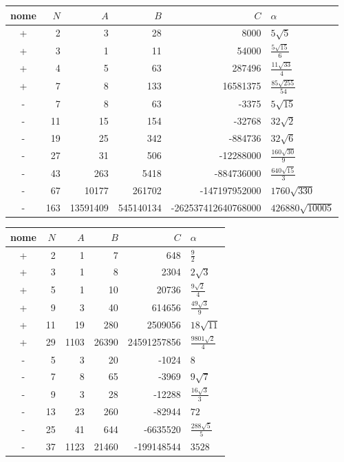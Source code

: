 \begin{identitytable}\centering\small
\caption{Standard level 1 identities, normalized by $B>0$.}
\label{tab:standard1}
\setlength{\tabcolsep}{4pt}
\renewcommand{\arraystretch}{1.15}
\begin{tabular}{@{}crrrrl@{}}\toprule
nome & $N$ & $A$ & $B$ & $C$ & $\alpha$\\\midrule
+&2&3&28&8000&$5 \sqrt{5}$\\
+&3&1&11&54000&$\frac{5 \sqrt{15}}{6}$\\
+&4&5&63&287496&$\frac{11 \sqrt{33}}{4}$\\
+&7&8&133&16581375&$\frac{85 \sqrt{255}}{54}$\\
-&7&8&63&-3375&$5 \sqrt{15}$\\
-&11&15&154&-32768&$32 \sqrt{2}$\\
-&19&25&342&-884736&$32 \sqrt{6}$\\
-&27&31&506&-12288000&$\frac{160 \sqrt{30}}{9}$\\
-&43&263&5418&-884736000&$\frac{640 \sqrt{15}}{3}$\\
-&67&10177&261702&-147197952000&$1760 \sqrt{330}$\\
-&163&13591409&545140134&-262537412640768000&$426880 \sqrt{10005}$\\
\bottomrule\end{tabular}\end{identitytable}
\begin{identitytable}\centering\small
\caption{Standard level 2 identities, normalized by $B>0$.}
\label{tab:standard2}
\setlength{\tabcolsep}{4pt}
\renewcommand{\arraystretch}{1.15}
\begin{tabular}{@{}crrrrl@{}}\toprule
nome & $N$ & $A$ & $B$ & $C$ & $\alpha$\\\midrule
+&2&1&7&648&$\frac{9}{2}$\\
+&3&1&8&2304&$2 \sqrt{3}$\\
+&5&1&10&20736&$\frac{9 \sqrt{2}}{4}$\\
+&9&3&40&614656&$\frac{49 \sqrt{3}}{9}$\\
+&11&19&280&2509056&$18 \sqrt{11}$\\
+&29&1103&26390&24591257856&$\frac{9801 \sqrt{2}}{4}$\\
-&5&3&20&-1024&$8$\\
-&7&8&65&-3969&$9 \sqrt{7}$\\
-&9&3&28&-12288&$\frac{16 \sqrt{3}}{3}$\\
-&13&23&260&-82944&$72$\\
-&25&41&644&-6635520&$\frac{288 \sqrt{5}}{5}$\\
-&37&1123&21460&-199148544&$3528$\\
\bottomrule\end{tabular}\end{identitytable}

